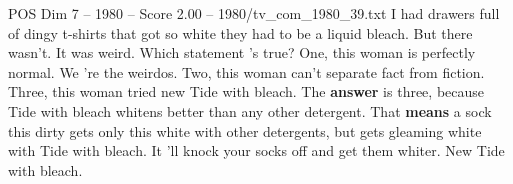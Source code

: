 \begin{textsample}{POS Dim 7 – 1980 – Score 2.00 – 1980/tv\_com\_1980\_39.txt}  \label{ex:f7_pos_041}
I had drawers full of dingy t-shirts that got so white they had to be a liquid bleach.
But there wasn't.
It was weird.
Which statement 's true?
One, this woman is perfectly normal.
We 're the weirdos.
Two, this woman can't separate fact from fiction.
Three, this woman tried new Tide with bleach.
The \textbf{answer} is three, because Tide with bleach whitens better than any other detergent.
That \textbf{means} a sock this dirty gets only this white with other detergents, but gets gleaming white with Tide with bleach.
It 'll knock your socks off and get them whiter.
New Tide with bleach.

\end{textsample}
